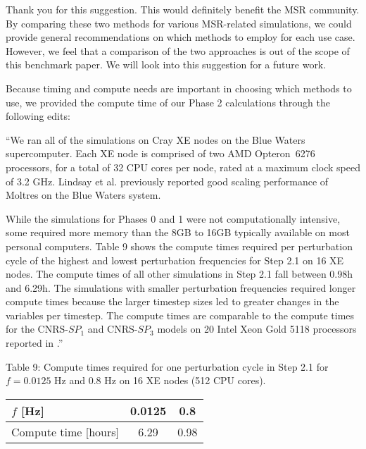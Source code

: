 \documentclass[answers,11pt]{exam}
\begin{document}
\begin{questions}
        \begin{solution}
            Thank you for this suggestion. This would definitely benefit the
            MSR community. By comparing these
            two methods for various MSR-related simulations, we could provide
            general recommendations on which methods to employ for each
            use case. However, we feel that a comparison of the two approaches
            is out of the scope of this benchmark paper. We will look into
            this suggestion for a future work.
        	
        	Because timing and compute needs are important in choosing which
        	methods to use, we provided the compute time of our
        	Phase 2 calculations through the following edits:
        	
        	``We ran all of the simulations on Cray XE nodes on the Blue Waters
supercomputer. Each XE node is comprised of two AMD Opteron\texttrademark\ 6276
processors, for a total of 32 CPU cores per node, rated at a maximum clock
speed of 3.2 GHz. Lindsay et al. \cite{lindsay_introduction_2018} previously
reported good scaling performance of Moltres on the Blue Waters system.

While the simulations for Phases 0 and 1 were not computationally intensive,
some required more memory than the 8GB to 16GB typically available on most
personal computers. Table 9 shows the compute times required
per perturbation cycle of the highest and lowest perturbation frequencies for
Step 2.1 on 16 XE nodes. The compute times of all other simulations in Step 2.1
fall between 0.98h and 6.29h. The simulations with smaller perturbation
frequencies required longer compute times because the larger timestep sizes led
to greater changes in the variables per timestep. The compute times are
comparable to the compute times for the CNRS-$SP_1$ and CNRS-$SP_3$ models on
20 Intel\textsuperscript{\tiny\textregistered}
Xeon\textsuperscript{\tiny\textregistered} Gold 5118 processors reported in
\cite{blanco_neutronic_2021,blanco_neutronic_2020}.''

        Table 9: Compute times required for one perturbation cycle in Step 2.1
        for $f=0.0125$ Hz and $0.8$ Hz on 16 XE nodes (512 CPU cores).
	    
	    \begin{tabular}{l c c}
		    \toprule
		    $f$ [Hz] & 0.0125 & 0.8 \\
		    \midrule
		    Compute time [hours] & 6.29 & 0.98 \\
		    \bottomrule
	    \end{tabular}
        \end{solution}


\end{questions}
\end{document}
